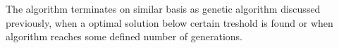 \documentclass[12pt,a4paper,openany]{book}
\begin{document}
\noindent The algorithm terminates on similar basis as genetic algorithm discussed previously, when a optimal solution below certain treshold is found or when algorithm reaches some defined number of generations.


%


%
%




%
\end{document}
